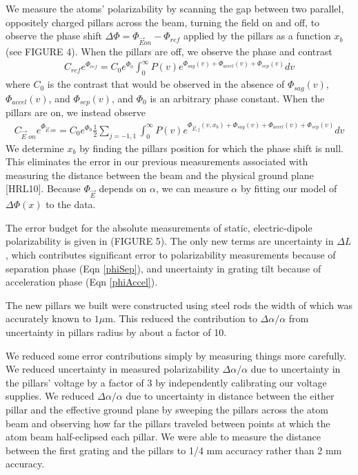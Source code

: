 \documentclass[12pt,letterpaper]{article}
\newcommand{\eqnref}[1]{Eqn \ref{#1}}
\begin{document}
We measure the atoms' polarizability by scanning the gap between two parallel, oppositely charged pillars across the beam, turning the field on and off, to observe the phase shift $\Delta\Phi = \Phi_{\vec{E} on} - \Phi_{ref}$ applied by the pillars as a function $x_b$ (see FIGURE 4). When the pillars are off, we observe the phase and contrast
\begin{align}
	C_{ref}e^{\Phi_{ref}} = 
		C_0e^{\Phi_0}
		\int_0^{\infty} P(v) 
		e^{\Phi_{sag}(v) + \Phi_{accel}(v) + \Phi_{sep}(v)} 
		dv
	\label{CPRef}
\end{align}
where $C_0$ is the contrast that would be observed in the absence of $\Phi_{sag}(v)$, $\Phi_{accel}(v)$, and $\Phi_{sep}(v)$, and $\Phi_0$ is an arbitrary phase constant. When the pillars are on, we instead observe
\begin{align}
	C_{\vec{E}\textit{ on}}e^{\Phi_{\vec{E}\textit{ on}}} = 
		C_0e^{\Phi_0}		
		\frac{1}{2} \sum_{j=-1,1}
		\int_0^{\infty} P(v) 
		e^{
			\Phi_{\vec{E},j}(v,x_b) + 
			\Phi_{sag}(v) + \Phi_{accel}(v) + \Phi_{sep}(v)
		} 
		dv
	\label{CPEOn}
\end{align}
We determine $x_b$ by finding the pillars position for which the phase shift is null. This eliminates the error in our previous measurements associated with measuring the distance between the beam and the physical ground plane [HRL10].
Because $\Phi_{\vec{E}}$ depends on $\alpha$, we can measure $\alpha$ by fitting our model of $\Delta\Phi(x)$ to the data.

The error budget for the absolute measurements of static, electric-dipole polarizability is given in (FIGURE 5). The only new terms are uncertainty in $\Delta L$, which contributes significant error to polarizability measurements because of separation phase (\eqnref{phiSep}), and uncertainty in grating tilt because of acceleration phase (\eqnref{phiAccel}).

The new pillars we built were constructed using steel rods the width of which was accurately known to $1 \mu \text{m}$. This reduced the contribution to $\Delta\alpha/\alpha$ from uncertainty in pillars radius by about a factor of 10.

We reduced some error contributions simply by measuring things more carefully. We reduced uncertainty in measured polarizability $\Delta\alpha/\alpha$ due to uncertainty in the pillars' voltage by a factor of 3 by independently calibrating our voltage supplies. We reduced $\Delta\alpha/\alpha$ due to uncertainty in distance between the either pillar and the effective ground plane by sweeping the pillars across the atom beam and observing how far the pillars traveled between points at which the atom beam half-eclipsed each pillar. We were able to measure the distance between the first grating and the pillars to 1/4 mm accuracy rather than 2 mm accuracy. 
\end{document}
